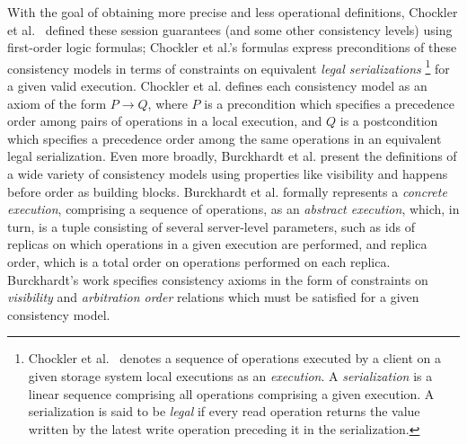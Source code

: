 \documentclass[journal,compsoc]{IEEEtran}
\begin{document}
 With the goal of obtaining more precise and less operational definitions, 
Chockler et al.~\cite{Chockler2000} defined these session guarantees (and some other consistency levels) using first-order logic formulas; Chockler et al.'s formulas express preconditions of these consistency models in terms of constraints on equivalent \emph{legal serializations} \footnote{Chockler et al.~\cite{Chockler2000} denotes a sequence of operations executed by a client on a given storage system local executions as an \emph{execution}. A \emph{serialization} is a linear sequence comprising all operations comprising a given execution. 
  A serialization is said to be \emph{legal} if every read operation returns the value written by the latest write
  operation preceding it in the serialization.} for a given valid execution. Chockler et al. defines each consistency model as an axiom of the form $P \rightarrow Q$, where $P$ is a  precondition which specifies a precedence order among pairs of operations in a local execution, and $Q$ is a postcondition which specifies a precedence order among the same operations in an equivalent legal serialization.  %
Even more broadly, Burckhardt et al. \cite{Burckhardt:2014:PEC:2693641.2693642} present the definitions of a wide variety of consistency models using properties like visibility and happens before order as building blocks. Burckhardt et al. \cite{DBLP:conf/popl/BurckhardtGYZ14, understanding-eventual-consistency, Burckhardt:2014:PEC:2693641.2693642} 
formally represents a \emph{concrete  execution}, comprising a sequence of operations, as an \emph{abstract execution}, which, in turn, is a tuple consisting of several server-level parameters, such as ids of replicas on which operations in a given execution are performed, and replica order, which is a total order on operations performed on each replica.  %
  Burckhardt's work 
  specifies consistency axioms in the form of constraints on \emph{visibility}  and \emph{arbitration order}  relations which must be satisfied %
   for a given consistency model.   
\end{document}
